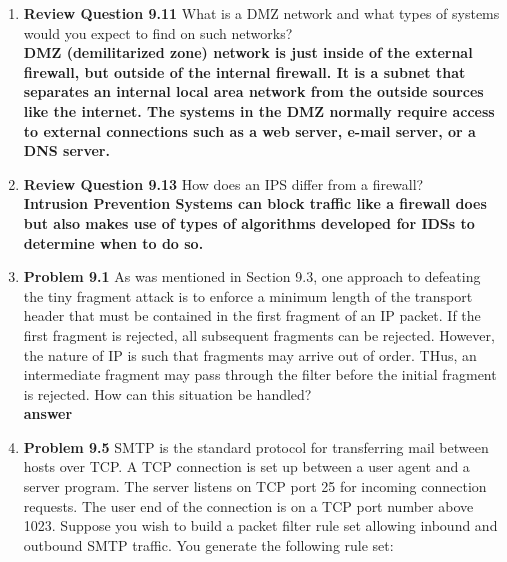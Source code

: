 \documentclass[12pt]{article}
\begin{document}
\renewcommand{\headrulewidth}{0.4pt}
\vspace{-3mm}
\begin{enumerate}
  \item \textbf{Review Question 9.11} What is a DMZ network and what types of systems would you expect to find on such networks? \\

  \textbf{DMZ (demilitarized zone) network is just inside of the external firewall, but outside of the internal firewall. It is a subnet that separates an internal local area network from the outside sources like the internet. The systems in the DMZ normally require access to external connections such as a web server, e-mail server, or a DNS server.} \\

  \item \textbf{Review Question 9.13} How does an IPS differ from a firewall? \\

  \textbf{Intrusion Prevention Systems can block traffic like a firewall does but also makes use of types of algorithms developed for IDSs to determine when to do so.} \\

  \item \textbf{Problem 9.1} As was mentioned in Section 9.3, one approach to defeating the tiny fragment attack is to enforce a minimum length of the transport header that must be contained in the first fragment of an IP packet. If the first fragment is rejected, all subsequent fragments can be rejected. However, the nature of IP is such that fragments may arrive out of order. THus, an intermediate fragment may pass through the filter before the initial fragment is rejected. How can this situation be handled? \\

  \textbf{answer} \\

  \item \textbf{Problem 9.5} SMTP is the standard protocol for transferring mail between hosts over TCP. A TCP connection is set up between a user agent and a server program. The server listens on TCP port 25 for incoming connection requests. The user end of the connection is on a TCP port number above 1023. Suppose you wish to build a packet filter rule set allowing inbound and outbound SMTP traffic. You generate the following rule set: \\


\end{enumerate}
\end{document}
